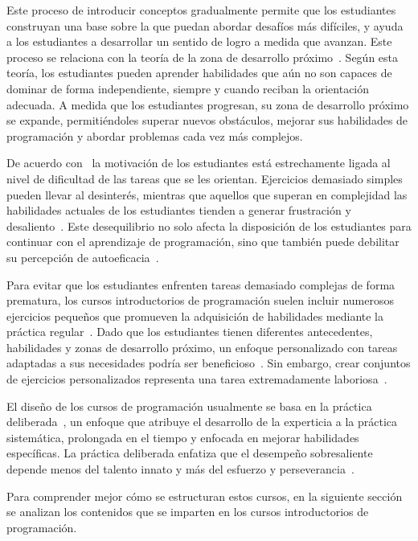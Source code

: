 \documentclass{article}
\begin{document}
Este proceso de introducir conceptos gradualmente permite que los estudiantes construyan una base sobre la que puedan abordar desafíos más difíciles, y ayuda a los estudiantes a desarrollar un sentido de logro a medida que avanzan. Este proceso se relaciona con la teoría de la zona de desarrollo próximo~\cite{vygotsky1978mind}. Según esta teoría, los estudiantes pueden aprender habilidades que aún no son capaces de dominar de forma independiente, siempre y cuando reciban la orientación adecuada. A medida que los estudiantes progresan, su zona de desarrollo próximo se expande, permitiéndoles superar nuevos obstáculos, mejorar sus habilidades de programación y abordar problemas cada vez más complejos.

De acuerdo con~\cite{rosenzweig2019expectancy} la motivación de los estudiantes está estrechamente ligada al nivel de dificultad de las tareas que se les orientan. Ejercicios demasiado simples pueden llevar al desinterés, mientras que aquellos que superan en complejidad las habilidades actuales de los estudiantes tienden a generar frustración y desaliento~\cite{rosenzweig2019expectancy}. Este desequilibrio no solo afecta la disposición de los estudiantes para continuar con el aprendizaje de programación, sino que también puede debilitar su percepción de autoeficacia~\cite{bandura1977self}.

Para evitar que los estudiantes enfrenten tareas demasiado complejas de forma prematura, los cursos introductorios de programación suelen incluir numerosos ejercicios pequeños que promueven la adquisición de habilidades mediante la práctica regular~\cite{allen2018msp, vihavainen2011extreme}. Dado que los estudiantes tienen diferentes antecedentes, habilidades y zonas de desarrollo próximo, un enfoque personalizado con tareas adaptadas a sus necesidades podría ser beneficioso~\cite{leinonen2021exploring}. Sin embargo, crear conjuntos de ejercicios personalizados representa una tarea extremadamente laboriosa~\cite{lobb2016coderunner, wrenn2018whotests}.

El diseño de los cursos de programación usualmente se basa en la práctica deliberada~\cite{ericsson1993deliberate}, un enfoque que atribuye el desarrollo de la experticia a la práctica sistemática, prolongada en el tiempo y enfocada en mejorar habilidades específicas. La práctica deliberada enfatiza que el desempeño sobresaliente depende menos del talento innato y más del esfuerzo y perseverancia~\cite{duckworth2013true}.

Para comprender mejor cómo se estructuran estos cursos, en la siguiente sección se analizan los contenidos que se imparten en los cursos introductorios de programación.
\end{document}
